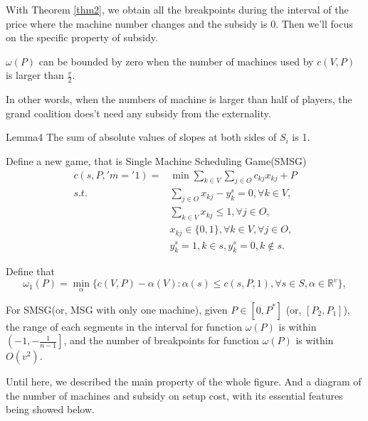 With Theorem \ref{thm2}, we obtain all the breakpoints during the interval of the price where the machine number changes and the subsidy is $0$. Then we'll focus on the specific property of subsidy.

\begin{thm}\label{thm3}
$\omega(P)$ can be bounded by zero when the number of machines used by $c(V,P)$ is larger than $\frac{v}{2}$.
\end{thm}

In other words, when the numbers of machine is larger than half of players, the grand coalition does't need any subsidy from the externality.

Lemma4 The sum of absolute values of slopes at both sides of $S_i$ is 1.

Define a new game, that is Single Machine Scheduling Game(SMSG)
\[
\begin{aligned}
c(s,P,'m='1) = & {\min} \sum_{k\in V}\sum_{j\in O} {c_{kj} x_{kj} + P} \\
{s.t.}\quad & \sum_{j \in O} x_{kj}-y_k^s=0, \forall k \in V, \\
& \sum_{k\in V} x_{kj} \leq 1, \forall j \in O,  \\
& x_{kj} \in \{0,1\} , \forall k \in V, \forall j \in O,\\
& y_k^s=1, k \in s, y_k^s=0, k \notin s.
\end{aligned}
\]

Define that
\[
  {\omega_1(P)}=\mathop{\min}_{\alpha}\{c(V,P)-\alpha(V): \alpha(s)\leq c(s,P,1), \forall s \in S, \alpha\in\mathbb{R}^{v}\},
\]

\begin{thm}\label{thm4}
For SMSG(or, MSG with only one machine), given $P \in [0, P^*]$ (or, $[P_2,P_1]$),
the range of each segments in the interval for function $\omega(P)$ is within $\left( -1 , -\frac{1}{n-1} \right]$, and the number of breakpoints for function $\omega(P)$ is within $ O(v^2) $.
\end{thm}

Until here, we described the main property of the whole figure.
And a diagram of the number of machines and subsidy on setup cost, with its essential features being showed below.

